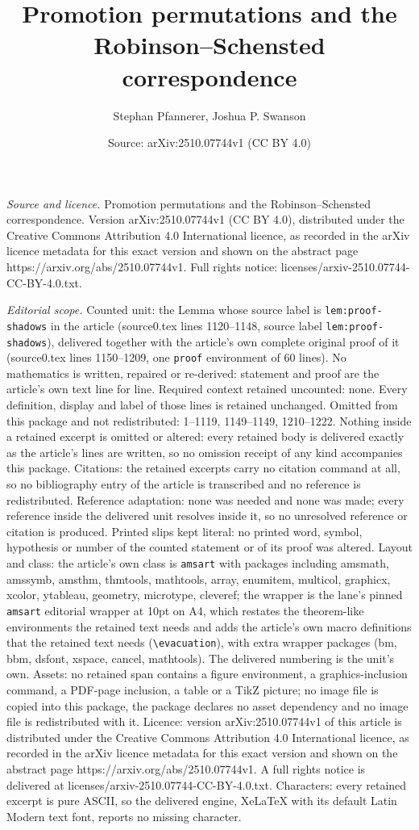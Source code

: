 \documentclass[10pt,a4paper]{amsart}
\title[Promotion permutations and the Robinson--Schensted correspon]{Promotion permutations and the Robinson--Schensted correspondence}
\author{Stephan Pfannerer, Joshua P. Swanson}
\date{Source: arXiv:2510.07744v1 (CC BY 4.0)}
\begin{document}
\maketitle

\noindent\emph{Source and licence.} Promotion permutations and the Robinson--Schensted correspondence. Version arXiv:2510.07744v1 (CC BY 4.0), distributed under the Creative Commons Attribution 4.0 International licence, as recorded in the arXiv licence metadata for this exact version and shown on the abstract page https://arxiv.org/abs/2510.07744v1. Full rights notice: licenses/arxiv-2510.07744-CC-BY-4.0.txt.\par\smallskip

\noindent\textit{Editorial scope.} Counted unit: the Lemma whose source label is \texttt{lem:proof-shadows} in the article (source0.tex lines 1120--1148, source label \texttt{lem:proof-shadows}), delivered together with the article's own complete original proof of it (source0.tex lines 1150--1209, one \texttt{proof} environment of 60 lines). No mathematics is written, repaired or re-derived: statement and proof are the article's own text line for line. Required context retained uncounted: none. Every definition, display and label of those lines is retained unchanged. Omitted from this package and not redistributed: 1--1119, 1149--1149, 1210--1222. Nothing inside a retained excerpt is omitted or altered: every retained body is delivered exactly as the article's lines are written, so no omission receipt of any kind accompanies this package. Citations: the retained excerpts carry no citation command at all, so no bibliography entry of the article is transcribed and no reference is redistributed. Reference adaptation: none was needed and none was made; every reference inside the delivered unit resolves inside it, so no unresolved reference or citation is produced. Printed slips kept literal: no printed word, symbol, hypothesis or number of the counted statement or of its proof was altered. Layout and class: the article's own class is \texttt{amsart} with packages including amsmath, amssymb, amsthm, thmtools, mathtools, array, enumitem, multicol, graphicx, xcolor, ytableau, geometry, microtype, cleveref; the wrapper is the lane's pinned \texttt{amsart} editorial wrapper at 10pt on A4, which restates the theorem-like environments the retained text needs and adds the article's own macro definitions that the retained text needs (\texttt{\textbackslash evacuation}), with extra wrapper packages (bm, bbm, dsfont, xspace, cancel, mathtools). The delivered numbering is the unit's own. Assets: no retained span contains a figure environment, a graphics-inclusion command, a PDF-page inclusion, a table or a TikZ picture; no image file is copied into this package, the package declares no asset dependency and no image file is redistributed with it. Licence: version arXiv:2510.07744v1 of this article is distributed under the Creative Commons Attribution 4.0 International licence, as recorded in the arXiv licence metadata for this exact version and shown on the abstract page https://arxiv.org/abs/2510.07744v1. A full rights notice is delivered at licenses/arxiv-2510.07744-CC-BY-4.0.txt. Characters: every retained excerpt is pure ASCII, so the delivered engine, XeLaTeX with its default Latin Modern text font, reports no missing character.
\end{document}
